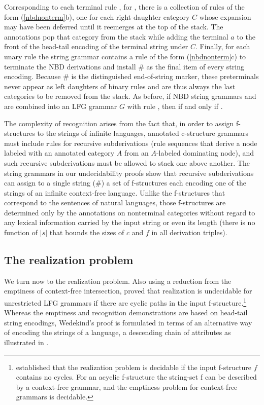 \documentclass[output=paper,hidelinks]{langscibook}
\begin{document}
\noindent  Corresponding to each terminal rule , for , there  is a collection of rules of the form 
(\ref{nbdnonterm}b), one for each right-daughter category $C$ whose expansion may have been deferred until it reemerges at the top of the stack. The annotations pop that category from the stack while adding the terminal $a$ to the front of the head-tail encoding of the terminal string under $C$. Finally,  for each unary rule  the string grammar contains a rule of the form (\ref{nbdnonterm}c) to terminate the NBD derivations and install \# as the final item of every string encoding. Because \# is the distinguished end-of-string marker, these preterminals never appear as left daughters of binary rules and are thus always the last categories to be removed from the stack.  As before, if NBD string grammars  and  are combined into an LFG grammar $G$ with rule , then \mb{\ParG{\#\#} \neq \emptyset} if and only if . 

The complexity of recognition arises from the fact that, in order to assign f-structures to the strings of infinite languages, annotated c-structure grammars must include rules for recursive subderivations (rule sequences that derive a node labeled with an annotated category $A$ from an $A$-labeled dominating node), and such recursive subderivations must be allowed to stack one above another.  The string grammars in our undecidability proofs show that recursive subderivations can assign to a single string (\#) a set of f-structures each encoding one of the strings of an infinite context-free language. Unlike the f-structures that correspond to the sentences of natural languages, those f-structures are determined only by the annotations on nonterminal categories without regard to any lexical information carried by the input string or even its length (there is no function of \mbox{$|s|$} that bounds the sizes of $c$ and $f$ in all derivation triples).   

\subsection{The realization problem}\label{undecidablerealization}
We turn now to the realization problem. Also using a reduction from the emptiness of context-free intersection, \citet{Wedekind2014} proved that realization is undecidable for unrestricted LFG grammars if there are cyclic paths in the input f-structure.\footnote{\citet{WedekindKaplan:Gen} established that the realization problem is decidable if the input f-structure $f$ contains no cycles.  For an acyclic f-structure the string-set \GenG f can be described by a context-free grammar, and the emptiness problem for context-free grammars is decidable.} Whereas the emptiness and recognition demonstrations are based on head-tail string encodings, Wedekind's proof is formulated in terms of an alternative way of encoding the strings of a language, a descending  chain of attributes as illustrated in .  
\end{document}

